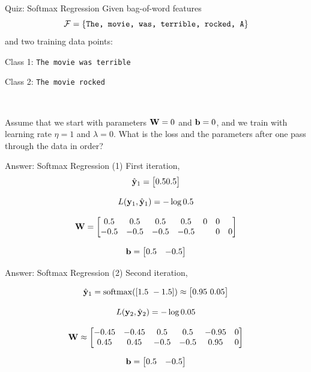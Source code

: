 \documentclass{beamer}
\begin{document}
\begin{frame}{Quiz: Softmax Regression}
  Given bag-of-word features \[\mathcal{F} = \{\mathrm{\texttt{The, movie, was, terrible, rocked, A}} \}\] and two training data points:
    
  \begin{center}
    Class 1: \texttt{The movie was terrible}
  
    Class 2: \texttt{The movie rocked}
  \end{center}
  \\

  \air 

  Assume that we start with parameters $\mathbf{W} = 0$ and $\mathbf{b} = 0$,
  and we train with learning rate $\eta = 1$ and $\lambda = 0$. What is
  the loss and the parameters after one pass through the data in order?
\end{frame}

\begin{frame}{Answer: Softmax Regression (1) }
  First iteration,
  \[\hat{\mathbf{y}}_1 = \begin{bmatrix} 0.5 0.5 \end{bmatrix}\]

  \[ L(\mathbf{y}_1, \hat{\mathbf{y}}_1) = - \log 0.5 \]

  \[ \mathbf{W} =
  \begin{bmatrix}
    0.5 & 0.5 & 0.5 & 0.5 & 0 & 0 \\
    -0.5 & -0.5 & -0.5 & -0.5 && 0 & 0 \\
  \end{bmatrix}
  \]

  
  \[ \mathbf{b} =
  \begin{bmatrix}
    0.5 & -0.5 \\
  \end{bmatrix} \]
\end{frame}


\begin{frame}{Answer: Softmax Regression (2) }
  Second iteration,

  \[\hat{\boldy}_1 = \softmax([1.5\ -1.5] ) \approx \begin{bmatrix} 0.95 \  0.05  \end{bmatrix}\]

  \[ L(\mathbf{y}_2, \hat{\mathbf{y}}_2) = - \log 0.05 \]

  \[ \mathbf{W} \approx
  \begin{bmatrix}
    -0.45 & -0.45 & 0.5 & 0.5 & -0.95 & 0 \\
     0.45 & 0.45 & -0.5 & -0.5 & 0.95 & 0 \\
  \end{bmatrix}
  \]

  \[ \mathbf{b} =
  \begin{bmatrix}
    0.5 & -0.5 \\
  \end{bmatrix} \]
\end{frame}
\end{document}
